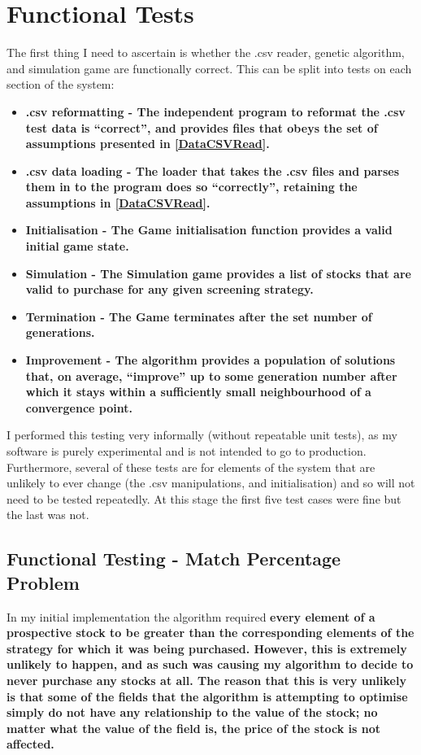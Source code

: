 \section{Functional Tests} \label{functTests}
The first thing I need to ascertain is whether the .csv reader, genetic algorithm, and simulation game are functionally correct. This can be split into tests on each section of the system:
\begin{itemize}
    \item \bf .csv reformatting \rm - The independent program to reformat the .csv test data is ``correct'', and provides files that obeys the set of assumptions presented in \ref{DataCSVRead}.
    \item \bf .csv data loading \rm - The loader that takes the .csv files and parses them in to the program does so ``correctly'', retaining the assumptions in \ref{DataCSVRead}.
    \item \bf Initialisation \rm - The Game initialisation function provides a valid initial game state.
    \item \bf Simulation \rm - The Simulation game provides a list of stocks that are valid to purchase for any given screening strategy.
    \item \bf Termination \rm - The Game terminates after the set number of generations.
    \item \bf Improvement \rm - The algorithm provides a population of solutions that, on average, ``improve'' up to some generation number after which it stays within a sufficiently small neighbourhood of a convergence point.
\end{itemize}

I performed this testing very informally (without repeatable unit tests), as my software is purely experimental and is not intended to go to production. Furthermore, several of these tests are for elements of the system that are unlikely to ever change (the .csv manipulations, and initialisation) and so will not need to be tested repeatedly. At this stage the first five test cases were fine but the last was not.

\subsection{Functional Testing - Match Percentage Problem} \label{testingConsequences}
In my initial implementation the algorithm required \bf every \rm element of a prospective stock to be greater than the corresponding elements of the strategy for which it was being purchased. However, this is extremely unlikely to happen, and as such was causing my algorithm to decide to never purchase any stocks at all. The reason that this is very unlikely is that some of the fields that the algorithm is attempting to optimise simply do not have any relationship to the value of the stock; no matter what the value of the field is, the price of the stock is not affected. \newline

